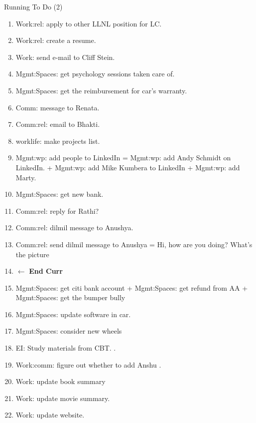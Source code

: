 \begin{frame}{Running To Do (2)} 
  \begin{enumerate}
    \conti    

\item \tiny Work:rel: apply to other LLNL position for LC. 
  \dl{} 

\item Work:rel: create a resume. 
\item Work: send e-mail to Cliff Stein.   

\item Mgmt:Spaces: get psychology sessions taken care of. 

\item Mgmt:Spaces: get the reimbursement for car's warranty. 

\item Comm: message to Renata.
\item Comm:rel: email to Bhakti. 

\item \tiny worklife: make projects list.
\item \tiny Mgmt:wp: add people to LinkedIn =  Mgmt:wp: add
  Andy Schmidt on LinkedIn. +  Mgmt:wp: add Mike Kumbera to
  LinkedIn + Mgmt:wp: add Marty. 
      
\item Mgmt:Spaces: get new bank. 
\item Comm:rel: reply for Rathi?
\item Comm:rel: dilmil message to Anushya.
\item \tiny Comm:rel: send dilmil message to Anushya = Hi, how are you doing? What's the picture

  \item[] \tiny  $\leftarrow$ \textbf{End Curr}
  \item \tiny Mgmt:Spaces: get citi bank account + Mgmt:Spaces: get refund from AA  + Mgmt:Spaces: get the bumper bully 
  \item \tiny Mgmt:Spaces: update software  in car. 
  \item \tiny  Mgmt:Spaces: consider new wheels 
  \item \tiny EI: Study materials from CBT.   .
  \item \tiny Work:comm: figure out whether to add Anshu .

\item \tiny Work: update book summary 
\item \tiny Work: update movie summary. 
\item \tiny Work: update website. 

  \end{enumerate}
  
 \end{frame}

